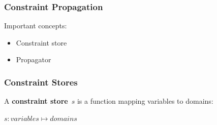 \documentclass{beamer}
\newcommand{\Dom}[1]{\text{dom}({#1})}
\begin{document}

\begin{frame}
  \frametitle{Constraint Propagation}
  Important concepts:
  \begin{itemize}
    \item Constraint store
    \item Propagator
  \end{itemize}
\end{frame}

\begin{frame}
  \frametitle{Constraint Stores}
  \begin{definition}
    A \textbf{constraint store}~$s$ is a function mapping variables
    to domains:
    \begin{center}
      $s: variables \mapsto domains$
    \end{center}
  \end{definition}

  



\end{frame}
\end{document}
